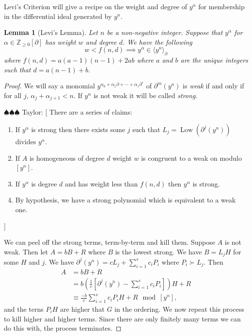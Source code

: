 \documentclass[]{article}
\newcommand{\taylor}[1]{{\color{blue} \sf $\spadesuit\spadesuit\spadesuit$ Taylor: [#1]}}
\numberwithin{equation}{section}
\newtheorem{lemma}[theorem]{Lemma}
\theoremstyle{definition}
\theoremstyle{remark}
\newcommand{\ZZ}{\mathbb{Z}}
\newcommand{\Low}{\operatorname{Low}}
\begin{document}
Levi's Criterion will give a recipe on the weight and degree of $y^{\alpha}$ for membership in the differential ideal generated by $y^n$.
\begin{lemma}[Levi's Lemma]\label{lem:levi}
	Let $n$ be a non-negative integer. 
	Suppose that $y^{\alpha}$ for $\alpha \in \ZZ_{\geq 0}[\partial]$ has weight $w$ and degree $d$. We have the following
	$$ w < f(n,d) \implies y^{\alpha} \in \langle y^n \rangle_{\partial} $$
	where $f(n,d) = a(a-1)(n-1)+2ab$ where $a$ and $b$ are the unique integers such that $d=a(n-1)+b$.
\end{lemma}
\begin{proof}
	We will say a monomial $y^{\alpha_0 + \alpha_1 \partial + \cdots + \alpha_s \partial^s}$ of $\partial^m(y^n)$ is \emph{weak} if and only if for all $j$, $\alpha_j + \alpha_{j+1} < n$. 
	If $y^{\alpha}$ is not weak it will be called \emph{strong}.
	
	\taylor{
		There are a series of claims:
		\begin{enumerate}
			\item If $y^{\alpha}$ is strong then there exists some $j$ such that $L_j=\Low(\partial^j(y^n))$ divides $y^{\alpha}$.
			\item  If $A$ is homogeneous of degree $d$ weight $w$ is congruent to a weak on modulo $[y^n]$.
			\item If $y^{\alpha}$ is degree $d$ and has weight less than $f(n,d)$ then $y^{\alpha}$ is strong. 
			\item By hypothesis, we have a strong polynomial which is equivalent to a weak one. 
		\end{enumerate}

	}
    We can peel off the strong terms, term-by-term and kill them. 
    Suppose $A$ is not weak. 
    Then let $A=bB+R$ where $B$ is the lowest strong. 
    We have $B = L_j H$ for some $H$ and $j$. 
    We have $\partial^j(y^n) = cL_j + \sum_{i=1}^s c_i P_i$ where $P_i \succ L_j$. 
    Then 
    \begin{align*}
    A &= bB+R \\
    &= b \left( \frac{1}{c} \left[ \partial^j(y^n) - \sum_{i=1}^s c_i P_i \right] \right)H + R\\
    &\equiv \frac{-b}{c} \sum_{i=1}^s c_i P_i H + R \mod [y^n],
    \end{align*}
	and the terns $P_iH$ are higher that $G$ in the ordering. 
	We now repeat this process to kill higher and higher terms. 
	Since there are only finitely many terms we can do this with, the process terminates. 
\end{proof}
\end{document}
